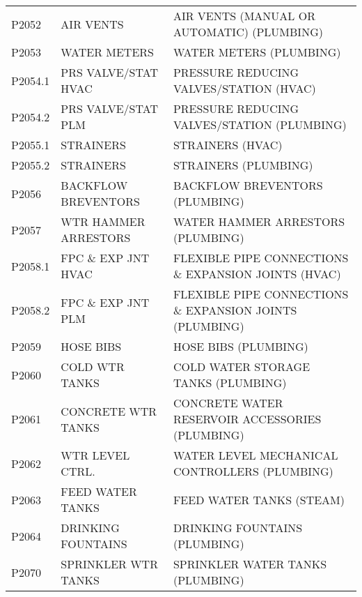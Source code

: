 \begin{longtable}[l]{l%
                  l|%
                  l|}
\rowcolor{thetableheadbgcolor!0.25!white} P2052       & AIR VENTS   & AIR VENTS (MANUAL OR AUTOMATIC) (PLUMBING)   \\
\rowcolor{thetableheadbgcolor!0.25!white} P2053       & WATER METERS   & WATER METERS (PLUMBING)   \\
\rowcolor{thetableheadbgcolor!0.25!white} P2054.1     & PRS VALVE/STAT HVAC   & PRESSURE REDUCING VALVES/STATION (HVAC)   \\
\rowcolor{thetableheadbgcolor!0.25!white} P2054.2     & PRS VALVE/STAT PLM   & PRESSURE REDUCING VALVES/STATION (PLUMBING)   \\
\rowcolor{thetableheadbgcolor!0.25!white} P2055.1     & STRAINERS   & STRAINERS (HVAC)   \\
\rowcolor{thetableheadbgcolor!0.25!white} P2055.2     & STRAINERS   & STRAINERS (PLUMBING)   \\
\rowcolor{thetableheadbgcolor!0.25!white} P2056       & BACKFLOW BREVENTORS   & BACKFLOW BREVENTORS (PLUMBING)   \\
\rowcolor{thetableheadbgcolor!0.25!white} P2057       & WTR HAMMER ARRESTORS   & WATER HAMMER ARRESTORS (PLUMBING)   \\
\rowcolor{thetableheadbgcolor!0.25!white} P2058.1     & FPC \& EXP JNT HVAC   & FLEXIBLE PIPE CONNECTIONS \& EXPANSION JOINTS (HVAC)   \\
\rowcolor{thetableheadbgcolor!0.25!white} P2058.2     & FPC \& EXP JNT PLM   & FLEXIBLE PIPE CONNECTIONS \& EXPANSION JOINTS (PLUMBING)   \\
\rowcolor{thetableheadbgcolor!0.25!white} P2059       & HOSE BIBS   & HOSE BIBS (PLUMBING)   \\
\rowcolor{thetableheadbgcolor!0.25!white} P2060       & COLD WTR TANKS   & COLD WATER STORAGE TANKS (PLUMBING)   \\
\rowcolor{thetableheadbgcolor!0.25!white} P2061       & CONCRETE WTR TANKS   & CONCRETE WATER RESERVOIR ACCESSORIES (PLUMBING)   \\
\rowcolor{thetableheadbgcolor!0.25!white} P2062       & WTR LEVEL CTRL.   & WATER LEVEL MECHANICAL CONTROLLERS (PLUMBING)   \\
\rowcolor{thetableheadbgcolor!0.25!white} P2063       & FEED WATER TANKS   & FEED WATER TANKS (STEAM)   \\
\rowcolor{thetableheadbgcolor!0.25!white} P2064       & DRINKING FOUNTAINS   & DRINKING FOUNTAINS (PLUMBING)   \\
\rowcolor{thetableheadbgcolor!0.25!white} P2070       & SPRINKLER WTR TANKS   & SPRINKLER WATER TANKS (PLUMBING)   \\

\end{longtable}
